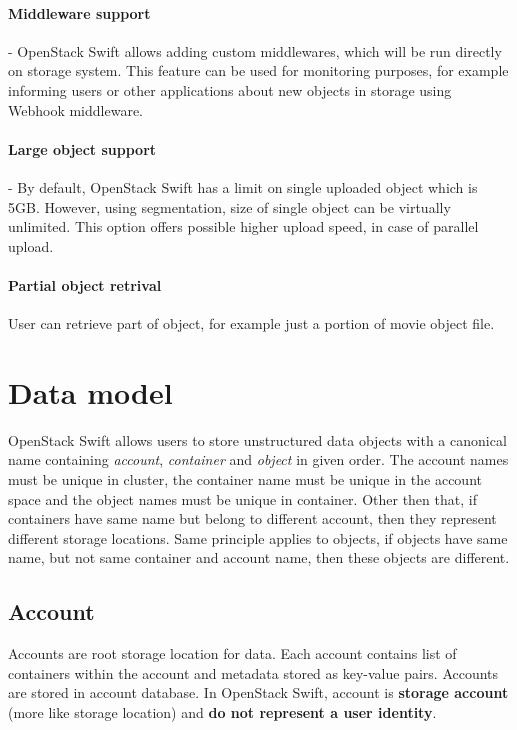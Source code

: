     \paragraph{Middleware support}
    - OpenStack Swift allows adding custom middlewares, which will be run directly on storage system\cite{swiftEssentials}. This feature can be used for monitoring purposes, for example informing users or other applications about new objects in storage using Webhook middleware.

    \paragraph{Large object support}
    - By default, OpenStack Swift has a limit on single uploaded object which is 5GB. However, using segmentation, size of single object can be virtually unlimited. This option offers possible higher upload speed, in case of parallel upload\cite{swiftLOS}.

    \paragraph{Partial object retrival}
    User can retrieve part of object, for example just a portion of movie object file\cite{swiftImplementingCloudStorage}.

    \section{Data model}
    OpenStack Swift allows users to store unstructured data objects with a canonical name containing \textit{account}, \textit{container} and \textit{object} in given order\cite{swiftOpenStackSwift}. The account names must be unique in cluster, the container name must be unique in the account space and the object names must be unique in container. Other then that, if containers have same name but belong to different account, then they represent different storage locations. Same principle applies to objects, if objects have same name, but not same container and account name, then these objects are different.

    \subsection{Account}
    Accounts are root storage location for data. Each account contains list of containers within the account and metadata stored as key-value pairs. Accounts are stored in account database. In OpenStack Swift, account is \textbf{storage account} (more like storage location) and \textbf{do not represent a user identity}\cite{swiftOpenStackSwift}.

